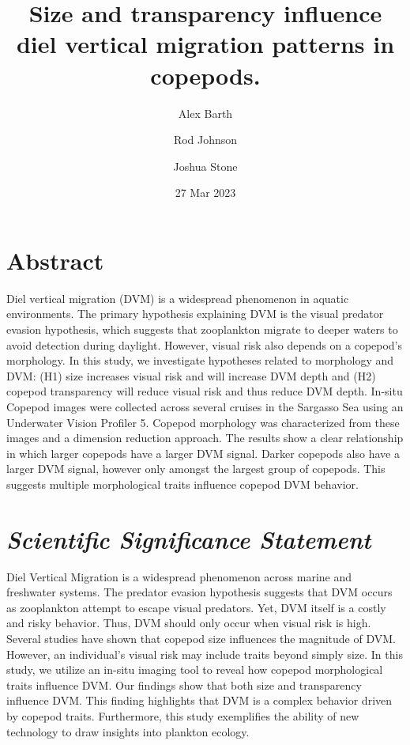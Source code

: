 \documentclass[
  letterpaper,
  DIV=11,
  numbers=noendperiod]{scrartcl}
\title{Size and transparency influence diel vertical migration patterns
in copepods.}
\author{Alex Barth \and Rod Johnson \and Joshua Stone}
\date{27 Mar 2023}
\begin{document}
\maketitle
\ifdefined\Shaded\renewenvironment{Shaded}{\begin{tcolorbox}[boxrule=0pt, interior hidden, borderline west={3pt}{0pt}{shadecolor}, enhanced, sharp corners, breakable, frame hidden]}{\end{tcolorbox}}\fi

\hypertarget{abstract}{%
\section{Abstract}\label{abstract}}

Diel vertical migration (DVM) is a widespread phenomenon in aquatic
environments. The primary hypothesis explaining DVM is the visual
predator evasion hypothesis, which suggests that zooplankton migrate to
deeper waters to avoid detection during daylight. However, visual risk
also depends on a copepod's morphology. In this study, we investigate
hypotheses related to morphology and DVM: (H1) size increases visual
risk and will increase DVM depth and (H2) copepod transparency will
reduce visual risk and thus reduce DVM depth. In-situ Copepod images
were collected across several cruises in the Sargasso Sea using an
Underwater Vision Profiler 5. Copepod morphology was characterized from
these images and a dimension reduction approach. The results show a
clear relationship in which larger copepods have a larger DVM signal.
Darker copepods also have a larger DVM signal, however only amongst the
largest group of copepods. This suggests multiple morphological traits
influence copepod DVM behavior.

\hypertarget{scientific-significance-statement}{%
\section{\texorpdfstring{\emph{Scientific Significance
Statement}}{Scientific Significance Statement}}\label{scientific-significance-statement}}

Diel Vertical Migration is a widespread phenomenon across marine and
freshwater systems. The predator evasion hypothesis suggests that DVM
occurs as zooplankton attempt to escape visual predators. Yet, DVM
itself is a costly and risky behavior. Thus, DVM should only occur when
visual risk is high. Several studies have shown that copepod size
influences the magnitude of DVM. However, an individual's visual risk
may include traits beyond simply size. In this study, we utilize an
in-situ imaging tool to reveal how copepod morphological traits
influence DVM. Our findings show that both size and transparency
influence DVM. This finding highlights that DVM is a complex behavior
driven by copepod traits. Furthermore, this study exemplifies the
ability of new technology to draw insights into plankton ecology.
\end{document}
